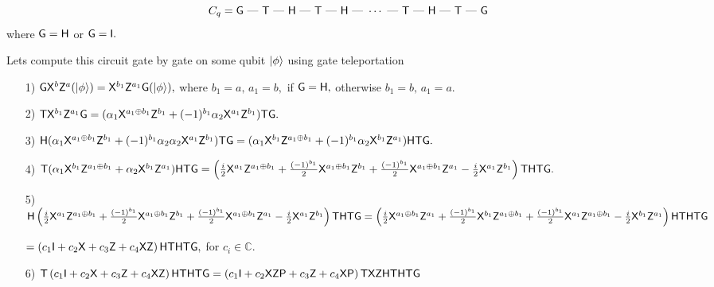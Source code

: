  $$C_q=\textsf{G}\mbox{ --- }{\sf T} \mbox{ --- } {\sf H} \mbox{ --- } {\sf T} \mbox{ --- } {\sf H} \mbox{ --- } \cdots \mbox{ --- } {\sf T} \mbox{ --- } {\sf H} \mbox{ --- } {\sf T} \mbox{ --- } \textsf{G}$$
  where $\textsf{G}={\sf H}$ or $\textsf{G}={\sf I}.$

Lets compute this circuit gate by gate on some qubit ${\lvert}\phi\rangle$ using gate teleportation
 \begin{enumerate}
\item[1)] $\textsf{G} {\sf X}^{b}{\sf Z}^{a}({\lvert}\phi\rangle)={\sf X}^{b_1}{\sf Z}^{a_1}\textsf{G}({\lvert}\phi\rangle),$
where $b_1=a,\, a_1=b,$ if $\textsf{G} ={\sf H},$  otherwise   $b_1=b,\, a_1=a.$\\
\item[2)] ${\sf T}{\sf X}^{b_1}{\sf Z}^{a_1}\textsf{G}= (\alpha_1{\sf X}^{a_1\oplus b_1 }{\sf Z}^{b_1} +(-1)^{b_1} \alpha_2{\sf X}^{a_1}{\sf Z}^{b_1}){\sf T} \textsf{G}.$
\item[3)]   ${\sf H} (\alpha_1{\sf X}^{a_1\oplus b_1 }{\sf Z}^{b_1} + (-1)^{b_1} \alpha_2\alpha_2{\sf X}^{a_1}{\sf Z}^{b_1}){\sf T} \textsf{G}=(\alpha_1{\sf X}^{b_1}{\sf Z}^{a_1\oplus b_1 } + (-1)^{b_1} \alpha_2{\sf X}^{b_1}{\sf Z}^{a_1}) {\sf H} {\sf T} \textsf{G}.$ 
\item[4)] ${\sf T}(\alpha_1{\sf X}^{b_1}{\sf Z}^{a_1\oplus b_1 } + \alpha_2{\sf X}^{b_1}{\sf Z}^{a_1}) {\sf H} {\sf T} \textsf{G}=\left(\frac{i}{2}{\sf X}^{a_1}{\sf Z}^{a_1\oplus b_1 } +  \frac{(-1)^{b_1}}{2}{\sf X}^{a_1\oplus b_1}{\sf Z}^{b_1}+
   \frac{(-1)^{b_1}}{2}{\sf X}^{a_1\oplus b_1}{\sf Z}^{a_1}  - \frac{i}{2}{\sf X}^{a_1}{\sf Z}^{b_1} \right) {\sf T}{\sf H} {\sf T} \textsf{G}.$

\item[5)]${\sf H}  \left(\frac{i}{2}{\sf X}^{a_1}{\sf Z}^{a_1\oplus b_1 } +  \frac{(-1)^{b_1}}{2}{\sf X}^{a_1\oplus b_1}{\sf Z}^{b_1}+
   \frac{(-1)^{b_1}}{2}{\sf X}^{a_1\oplus b_1}{\sf Z}^{a_1}  - \frac{i}{2}{\sf X}^{a_1}{\sf Z}^{b_1} \right){\sf T}{\sf H} {\sf T} \textsf{G}\\=  \left(\frac{i}{2}{\sf X}^{a_1\oplus b_1}{\sf Z}^{a_1} +  \frac{(-1)^{b_1}}{2}{\sf X}^{b_1}{\sf Z}^{a_1\oplus b_1}+
   \frac{(-1)^{b_1}}{2}{\sf X}^{a_1}{\sf Z}^{a_1\oplus b_1}  - \frac{i}{2}{\sf X}^{b_1}{\sf Z}^{a_1} \right){\sf H} {\sf T}{\sf H} {\sf T} \textsf{G}$

   $=\left(c_1{\sf I}+ c_2{\sf X}+c_3{\sf Z}+c_4{\sf X}{\sf Z}\right){\sf H}{\sf T}{\sf H} {\sf T} \textsf{G},$  for $c_i\in \mathbb{C}.$
\item[6)]  ${\sf T}\left(c_1{\sf I}+ c_2{\sf X}+c_3{\sf Z}+c_4{\sf X}{\sf Z}\right){\sf H}{\sf T}{\sf H} {\sf T} \textsf{G}=\left(c_1{\sf I}+ c_2{\sf X} {\sf Z}{\sf P}+c_3{\sf Z} +c_4{\sf X}{\sf P}\right){\sf T} {\sf X}{\sf Z}{\sf H}{\sf T}{\sf H} {\sf T} \textsf{G}$


\end{enumerate}

